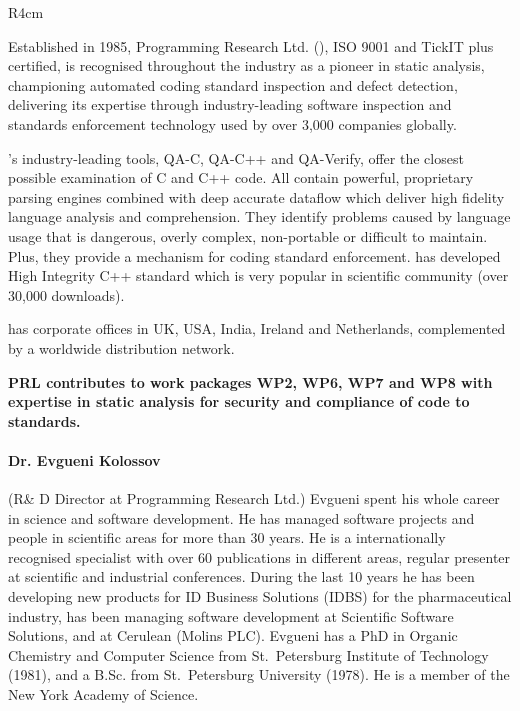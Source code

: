 \documentclass[a4paper,11pt]{article}
\begin{document}
\begin{wrapfigure}{R}{4cm}
\vspace{-2cm}
\hfill {}
\vspace{-3cm}
\end{wrapfigure}


Established in 1985, Programming Research Ltd. (\PRshort{}), ISO 9001 and TickIT plus certified, is recognised throughout the industry as a pioneer in static analysis, championing automated coding standard inspection and defect detection, delivering its expertise through industry-leading software inspection and standards enforcement technology used by over 3,000 companies globally.

\PRshort{}'s industry-leading tools, QA-C, QA-C++ and QA-Verify, offer the closest possible examination of C and C++ code. All contain powerful, proprietary parsing engines combined with deep accurate dataflow which deliver high fidelity language analysis and comprehension. They identify problems caused by language usage that is dangerous, overly complex, non-portable or difficult to maintain. Plus, they provide a mechanism for coding standard enforcement. 
\PRshort{} has developed High Integrity C++ standard which is very popular in scientific community (over 30,000 downloads).

\PRshort{} has corporate offices in UK, USA, India, Ireland and Netherlands, complemented by a worldwide distribution network.

\vspace{10pt}
\textbf{PRL contributes to work packages WP2, WP6, WP7 and WP8 with expertise in static analysis for security and compliance of code to standards.}
\vspace{10pt}



\paragraph{Dr. Evgueni Kolossov} 
(R\& D Director at Programming Research Ltd.)
Evgueni spent his whole career in science and software development. He
has managed software projects and people in scientific areas for more
than 30 years. He is a internationally recognised specialist with over
60 publications in different areas, regular presenter at scientific
and industrial conferences. During the last 10 years he has been
developing new products for ID Business Solutions (IDBS) for the
pharmaceutical industry, has been managing software development at
Scientific Software Solutions, and at Cerulean (Molins PLC). Evgueni
has a PhD in Organic Chemistry and Computer Science from
St.\ Petersburg Institute of Technology (1981), and a B.Sc. from St.\ Petersburg University (1978). He is a member of the New York Academy of Science.
\end{document}
